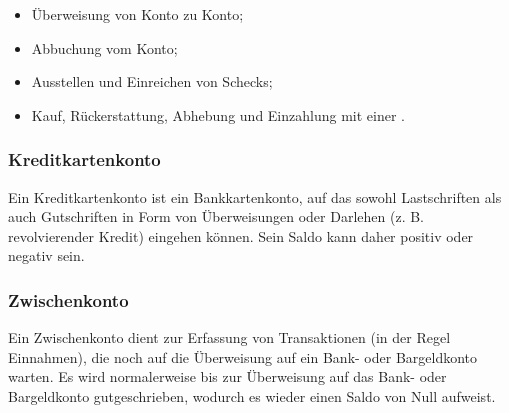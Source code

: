 \begin{itemize}
	\item Überweisung von Konto zu Konto;
	\item Abbuchung vom Konto;
	\item Ausstellen und Einreichen von Schecks;
	\item Kauf, Rückerstattung, Abhebung und Einzahlung mit einer .
\end{itemize}


\subsubsection{Kreditkartenkonto\label{accounts-type-bank-creditcard}}

Ein Kreditkartenkonto ist ein Bankkartenkonto, auf das sowohl Lastschriften als auch Gutschriften in Form von Überweisungen oder Darlehen (z. B. revolvierender Kredit) eingehen können. Sein Saldo kann daher positiv oder negativ sein.


\subsubsection{Zwischenkonto\label{accounts-type-bank-waiting}}

Ein Zwischenkonto dient zur Erfassung von Transaktionen (in der Regel Einnahmen), die noch auf die Überweisung auf ein Bank- oder Bargeldkonto warten. Es wird normalerweise bis zur Überweisung auf das Bank- oder Bargeldkonto gutgeschrieben, wodurch es wieder einen Saldo von Null aufweist.

